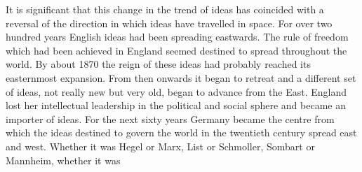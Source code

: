 \documentclass[11pt,openany]{book}
\begin{document}
\begin{center}\textasteriskcentered\hspace{0.9em}\textasteriskcentered\hspace{0.9em}\textasteriskcentered\end{center}

It is significant that this change in the trend of ideas has coincided with a reversal of the direction in which ideas have travelled in space. For over two hundred years English ideas had been spreading eastwards. The rule of freedom which had been achieved in England seemed destined to spread throughout the world. By about 1870 the reign of these ideas had probably reached its easternmost expansion. From then onwards it began to retreat and a different set of ideas, not really new but very old, began to advance from the East. England lost her intellectual leadership in the political and social sphere and became an importer of ideas. For the next sixty years Germany became the centre from which the ideas destined to govern the world in the twentieth century spread east and west. Whether it was Hegel or Marx, List or Schmoller, Sombart or Mannheim, whether it was
\end{document}
